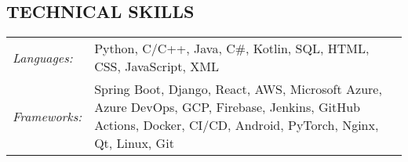 \documentclass{res}
\begin{document}
\begin{resume}

      

\vspace{-0.2in}
\section{TECHNICAL SKILLS}  
    \vspace{+0.1in}
    \hspace{-0.12in} 
    \begin{tabular}{l p{5.5in}}
    \rule{0in}{0.2in}
    {\sl Languages:} & Python, C/C++, Java, C\#, Kotlin, SQL, HTML, CSS, JavaScript, XML \\
    \rule{0in}{0.2in}
    {\sl Frameworks:} & Spring Boot, Django, React, AWS, Microsoft Azure, Azure DevOps, GCP, Firebase, 
                        Jenkins, GitHub Actions, Docker, CI/CD, Android, PyTorch, Nginx, Qt, Linux, Git
    \end{tabular}   
    
\end{resume}
\end{document}
